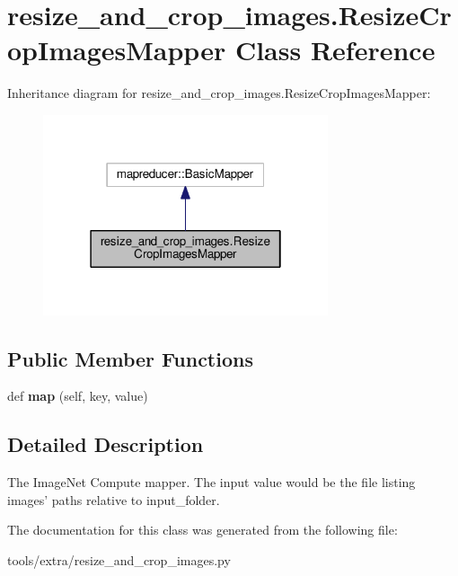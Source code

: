 \hypertarget{classresize__and__crop__images_1_1_resize_crop_images_mapper}{}\section{resize\+\_\+and\+\_\+crop\+\_\+images.\+Resize\+Crop\+Images\+Mapper Class Reference}
\label{classresize__and__crop__images_1_1_resize_crop_images_mapper}


Inheritance diagram for resize\+\_\+and\+\_\+crop\+\_\+images.\+Resize\+Crop\+Images\+Mapper\+:
\nopagebreak
\begin{figure}[H]
\begin{center}
\leavevmode
\includegraphics[width=238pt]{classresize__and__crop__images_1_1_resize_crop_images_mapper__inherit__graph}
\end{center}
\end{figure}
\subsection*{Public Member Functions}
\begin{DoxyCompactItemize}
\item 
\mbox{\label{classresize__and__crop__images_1_1_resize_crop_images_mapper_a5c505f817db6307e9b8b91a6236f5b27}} 
def {\bfseries map} (self, key, value)
\end{DoxyCompactItemize}


\subsection{Detailed Description}
\begin{DoxyVerb}The ImageNet Compute mapper. 
The input value would be the file listing images' paths relative to input_folder.
\end{DoxyVerb}
 

The documentation for this class was generated from the following file\+:\begin{DoxyCompactItemize}
\item 
tools/extra/resize\+\_\+and\+\_\+crop\+\_\+images.\+py\end{DoxyCompactItemize}
